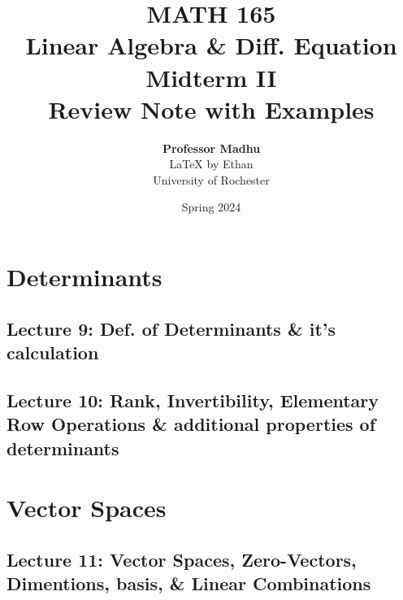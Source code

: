 \documentclass[oneside]{book}
\def\notetitle{MATH 165\\Linear Algebra \& Diff. Equation\\Midterm II \\Review Note with Examples}
\def\noteauthor{
    \textbf{Professor Madhu} \\ 
    {\LaTeX} by Ethan\\
    University of Rochester}
\def\notedate{Spring 2024}
\begin{document}
\title{\textbf{
    \LARGE{\notetitle} \vspace*{10\baselineskip}}
    }
\author{\noteauthor}
\date{\notedate}

\maketitle
\newpage

\tableofcontents
\newpage

\chapter{Determinants}
\section{Lecture 9: Def. of Determinants \& it's calculation}





























\section{Lecture 10: Rank, Invertibility, Elementary Row Operations \& additional properties of determinants}







\chapter{Vector Spaces}
\section{Lecture 11: Vector Spaces, Zero-Vectors, Dimentions, basis, \& Linear Combinations}
\end{document}
